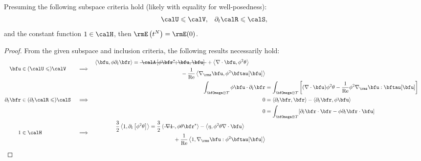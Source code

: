     \begin{theorem}
        Presuming the following subspace criteria hold (likely with equality for well-posedness):
        \begin{align}
            \calU  \leqslant  \calV,  &&
            \partial_{t}\calR  \leqslant  \calS,
        \end{align}
        and the constant function $1  \in  \calH$, then $\rmE\left(t^{N}\right)  =  \rmE(0)$.
    \end{theorem}
    \begin{proof}
        From the given subspace and inclusion criteria, the following results necessarily hold:
        \begin{align}
            \bfu  &\in  (\calU  \leqslant)  \calV  &&\implies  &  \begin{split}
                \langle\bfu, \phi\partial_{t}\bfr\rangle  &=  \mst{\calA\left[\phi\bfr^{*}; \bfu, \bfu\right]} + \left\langle\nabla\cdot\bfu, \phi^{2}\theta\right\rangle  \\
                &\;\;\;\;\;\;\;\;\;\;\;\;\;\;\;\;\;\;\;\;\;\;\;\;\;\;\;\;\;\;\;\;- \frac{1}{\rmRe}\left\langle\nabla_{\rms}\bfu, \phi^{2}\bftau[\bfu]\right\rangle
            \end{split}  \\
            &&&&  \int_{\bfOmega\otimes T}\phi\bfu\cdot\partial_{t}\bfr  &=  \int_{\bfOmega\otimes T}\left[(\nabla\cdot\bfu)\phi^{2}\theta - \frac{1}{\rmRe}\phi^{2}\nabla_{\rms}\bfu:\bftau[\bfu]\right]  \\
            \partial_{t}\bfr  &\in  (\partial_{t}\calR  \leqslant)  \calS  &&\implies  &  0  &=  \langle\partial_{t}\bfr, \bfr\rangle - \langle\partial_{t}\bfr, \phi\bfu\rangle  \\
            &&&&  0  &=  \int_{\bfOmega\otimes T}[\partial_{t}\bfr\cdot\bfr - \phi\partial_{t}\bfr\cdot\bfu]  \\
            1  &\in  \calH  &&\implies  &    
            \begin{split}
                \frac{3}{2}\left\langle 1, \partial_{t}\left[\phi^{2}\theta\right]\right\rangle  &=  \frac{3}{2}\left\langle\mst{\nabla 1}, \phi\theta\bfr^{*}\right\rangle - \left\langle\eta, \phi^{2}\theta\nabla\cdot\bfu\right\rangle  \\
                &\;\;\;\;\;\;\;\;\;\;\;\;\;\;\;\;+ \frac{1}{\rmRe}\left\langle 1, \nabla_{\rms}\bfu:\phi^{2}\bftau[\bfu]\right\rangle  \\

\end{split}
\end{align}
\end{proof}
